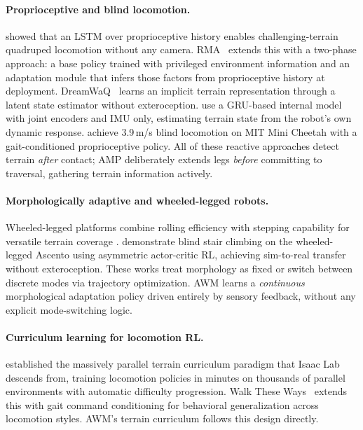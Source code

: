 \documentclass{article}
\begin{document}
\paragraph{Proprioceptive and blind locomotion.}
\citet{lee2020learning} showed that an LSTM over proprioceptive history enables
challenging-terrain quadruped locomotion without any camera.
RMA~\citep{kumar2021rma} extends this with a two-phase approach: a base policy trained
with privileged environment information and an adaptation module that infers those factors
from proprioceptive history at deployment.
DreamWaQ~\citep{nahrendra2023dreamwaq} learns an implicit terrain representation through
a latent state estimator without exteroception.
\citet{ji2024hybrid} use a GRU-based internal model with joint encoders and IMU only,
estimating terrain state from the robot's own dynamic response.
\citet{margolis2024rapid} achieve 3.9\,m/s blind locomotion on MIT Mini Cheetah with
a gait-conditioned proprioceptive policy.
All of these reactive approaches detect terrain \emph{after} contact; AMP deliberately
extends legs \emph{before} committing to traversal, gathering terrain information actively.

\paragraph{Morphologically adaptive and wheeled-legged robots.}
Wheeled-legged platforms combine rolling efficiency with stepping capability for versatile
terrain coverage \citep{bjelonic2019keep, bjelonic2021whole, klemm2019ascento}.
\citet{rudin2024blind} demonstrate blind stair climbing on the wheeled-legged Ascento
using asymmetric actor-critic RL, achieving sim-to-real transfer without exteroception.
These works treat morphology as fixed or switch between discrete modes via trajectory
optimization. AWM learns a \emph{continuous} morphological adaptation policy driven
entirely by sensory feedback, without any explicit mode-switching logic.

\paragraph{Curriculum learning for locomotion RL.}
\citet{rudin2022learning} established the massively parallel terrain curriculum paradigm
that Isaac Lab descends from, training locomotion policies in minutes on thousands of
parallel environments with automatic difficulty progression. Walk These Ways~\citep{margolis2022walk}
extends this with gait command conditioning for behavioral generalization across locomotion
styles. AWM's terrain curriculum follows this design directly.
\end{document}
